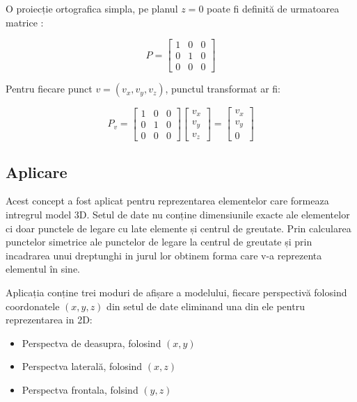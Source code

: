 
O proiecție ortografica simpla, pe planul \(z=0\) poate fi definită de urmatoarea matrice \cite{ortographic}:

\[
P=
  \begin{bmatrix}
    1 & 0 & 0 \\
    0 & 1 & 0 \\
    0 & 0 & 0 
  \end{bmatrix}
\]

Pentru fiecare punct \(v=(v_x,v_y,v_z)\), punctul transformat ar fi:

\[
P_v=
  \begin{bmatrix}
    1 & 0 & 0 \\
    0 & 1 & 0 \\
    0 & 0 & 0 
  \end{bmatrix}
  \begin{bmatrix}
    v_x  \\
    v_y  \\
    v_z  
  \end{bmatrix}
  =
  \begin{bmatrix}
    v_x  \\
    v_y  \\
    0  
  \end{bmatrix}
\]

\subsection{Aplicare}

Acest concept a fost aplicat pentru reprezentarea elementelor care formeaza intregrul model 3D. 
Setul de date nu conține dimensiunile exacte ale elementelor ci doar punctele de legare cu late elemente și centrul de greutate.
Prin calcularea punctelor simetrice ale punctelor de legare la centrul de greutate și prin incadrarea unui dreptunghi in jurul lor
obtinem forma care v-a reprezenta elementul în sine.\newline 

Aplicația conține trei moduri de afișare a modelului, fiecare perspectivă folosind coordonatele \((x,y,z)\) din setul de date 
eliminand una din ele pentru reprezentarea in 2D:
\begin{itemize}
\item Perspectva de deasupra, folosind \((x,y)\)     
\item Perspectva laterală, folosind \((x,z)\)
\item Perspectva frontala, folsind \((y,z)\)
\end{itemize}